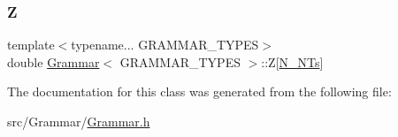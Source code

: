 \mbox{\label{class_grammar_a63420ee4232c46523a46bd881cb3e2f5}} 
\subsubsection{\texorpdfstring{Z}{Z}}
{\footnotesize\ttfamily template$<$typename... G\+R\+A\+M\+M\+A\+R\+\_\+\+T\+Y\+P\+ES$>$ \\
double \hyperlink{class_grammar}{Grammar}$<$ G\+R\+A\+M\+M\+A\+R\+\_\+\+T\+Y\+P\+ES $>$\+::Z\mbox{[}\hyperlink{class_grammar_a45877d4d7a5ee98bf6753af593d6ca08}{N\+\_\+\+N\+Ts}\mbox{]}}



The documentation for this class was generated from the following file\+:\begin{DoxyCompactItemize}
\item 
src/\+Grammar/\hyperlink{_grammar_8h}{Grammar.\+h}\end{DoxyCompactItemize}
